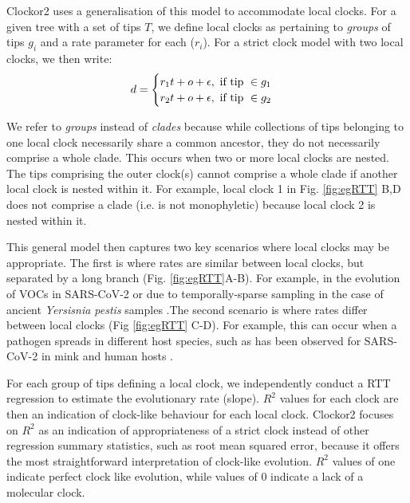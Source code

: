 \documentclass{article}
\begin{document}
Clockor2 uses a generalisation of this model to accommodate local clocks. For a given tree with a set of tips $T$, we define local clocks as pertaining to \textit{groups} of tips $g_i$ and a rate parameter for each ($r_i$). For a strict clock model with two local clocks, we then write:
\begin{equation*}
    d = 
    \begin{cases}
    r_{1}t + o + \epsilon, \textnormal{ if tip }\in g_1\\
    r_{2}t + o + \epsilon, \textnormal{ if tip }\in g_2
    
    \end{cases}
\end{equation*}

We refer to \emph{groups} instead of \emph{clades} because while collections of tips belonging to one local clock necessarily share a common ancestor, they do not necessarily comprise a whole clade. This occurs when two or more local clocks are nested. The tips comprising the outer clock(s) cannot comprise a whole clade if another local clock is nested within it. For example, local clock 1 in Fig. \ref{fig:egRTT} B,D does not comprise a clade (i.e. is not monophyletic) because local clock 2 is nested within it.

This general model then captures two key scenarios where local clocks may be appropriate. The first is where rates are similar between local clocks, but separated by a long branch (Fig. \ref{fig:egRTT}A-B). For example, in the evolution of VOCs in SARS-CoV-2 or due to temporally-sparse sampling in the case of ancient \textit{Yersisnia pestis} samples \citet{tay2022emergence, eaton2023plagued}.The second scenario is where rates differ between local clocks (Fig \ref{fig:egRTT} C-D). For example, this can occur when a pathogen spreads in different host species, such as has been observed for SARS-CoV-2 in mink and human hosts \citep{porter2023evolutionary}.

For each group of tips defining a local clock, we independently conduct a RTT regression to estimate the evolutionary rate (slope). $R^2$ values for each clock are then an indication of clock-like behaviour for each local clock. Clockor2 focuses on $R^2$ as an indication of appropriateness of a strict clock instead of other regression summary statistics, such as root mean squared error, because it offers the most straightforward interpretation of clock-like evolution. $R^2$ values of one indicate perfect clock like evolution, while values of 0 indicate a lack of a molecular clock. 
\end{document}
